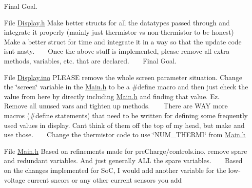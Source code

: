 \begin{DoxyRefList}
 Final Goal.  
\item[File \mbox{\hyperlink{_display_8h}{Display.h}} ]\label{todo__todo000005}%
%
 Make better structs for all the datatypes passed through and integrate it properly (mainly just thermistor vs non-\/thermistor to be honest) ~\newline
 ~\newline
 Make a better struct for time and integrate it in a way so that the update code isn\textquotesingle{}t nasty. ~\newline
 ~\newline
 Once the above stuff is implemented, please remove all extra methods, variables, etc. that are declared. ~\newline
 ~\newline
 Final Goal.  
\item[File \mbox{\hyperlink{_display_8ino}{Display.ino}} ]\label{todo__todo000006}%
%
 PLEASE remove the whole screen parameter situation. Change the \char`\"{}screen\char`\"{} variable in the \mbox{\hyperlink{_main_8h}{Main.\+h}} to be a \#define macro and then just check the value from here by directly including \mbox{\hyperlink{_main_8h}{Main.\+h}} and finding that value. Ez. ~\newline
 ~\newline
 Remove all unused vars and tighten up methods. ~\newline
 ~\newline
 There are WAY more macros (\#define statements) that need to be written for defining some frequently used values in display. Can\textquotesingle{}t think of them off the top of my head, but make and use those. ~\newline
 ~\newline
 Change the thermistor code to use \char`\"{}\+NUM\+\_\+\+THERMI\char`\"{} from \mbox{\hyperlink{_main_8h}{Main.\+h}}  
\item[File \mbox{\hyperlink{_main_8h}{Main.h}} ]\label{todo__todo000007}%
%
 Based on refinements made for pre\+Charge/controls.\+ino, remove spare and redundant variables. And just generally ALL the spare variables. ~\newline
 ~\newline
 Based on the changes implemented for SoC, I would add another variable for the low-\/voltage current sneors or any other current sensors you add ~\newline
 ~\newline

\end{DoxyRefList}
